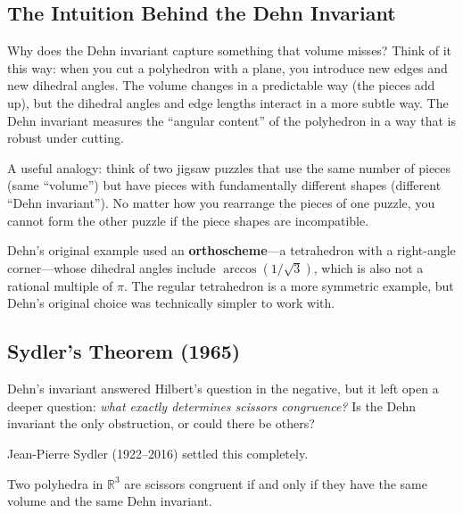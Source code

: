 \subsection{The Intuition Behind the Dehn Invariant}

Why does the Dehn invariant capture something that volume misses? Think of it this way: when you cut a polyhedron with a plane, you introduce new edges and new dihedral angles. The volume changes in a predictable way (the pieces add up), but the dihedral angles and edge lengths interact in a more subtle way. The Dehn invariant measures the ``angular content'' of the polyhedron in a way that is robust under cutting.

A useful analogy: think of two jigsaw puzzles that use the same number of pieces (same ``volume'') but have pieces with fundamentally different shapes (different ``Dehn invariant''). No matter how you rearrange the pieces of one puzzle, you cannot form the other puzzle if the piece shapes are incompatible.

\begin{remark}
Dehn's original example used an \textbf{orthoscheme}---a tetrahedron with a right-angle corner---whose dihedral angles include $\arccos(1/\sqrt{3})$, which is also not a rational multiple of $\pi$. The regular tetrahedron is a more symmetric example, but Dehn's original choice was technically simpler to work with.
\end{remark}

\subsection{Sydler's Theorem (1965)}

Dehn's invariant answered Hilbert's question in the negative, but it left open a deeper question: \emph{what exactly determines scissors congruence?} Is the Dehn invariant the only obstruction, or could there be others?

Jean-Pierre Sydler (1922--2016) settled this completely.

\begin{theorem}[Sydler, 1965]\label{thm:sydler}
Two polyhedra in $\mathbb{R}^3$ are scissors congruent if and only if they have the same volume and the same Dehn invariant.
\end{theorem}

